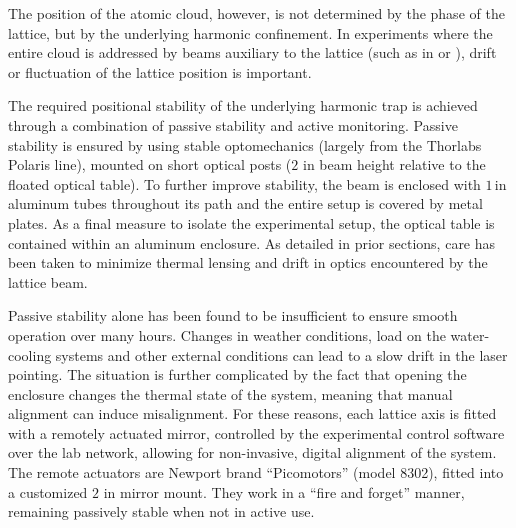 \documentclass[twocolumn,aps,pra,showpacs,preprintnumbers,bibnotes]{revtex4-1}
\begin{document}
The position of the atomic cloud, however, is not determined by the phase of the lattice, but by the underlying harmonic confinement. 
In experiments where the entire cloud is addressed by beams auxiliary to the lattice (such as in \cite{Mazurenko2016} or \cite{Choi2016}), drift or fluctuation of the lattice position is important.

The required positional stability of the underlying harmonic trap is achieved through a combination of passive stability and active monitoring. 
Passive stability is ensured by using stable optomechanics (largely from the Thorlabs Polaris line), mounted on short optical posts ($2$ in beam height relative to the floated optical table).
To further improve stability, the beam is enclosed with $1\,$in aluminum tubes throughout its path and the entire setup is covered by metal plates.
As a final measure to isolate the experimental setup, the optical table is contained within an aluminum enclosure. As detailed in prior sections, care has been taken to minimize thermal lensing and drift in optics encountered by the lattice beam.

Passive stability alone has been found to be insufficient to ensure smooth operation over many hours. Changes in weather conditions, load on the water-cooling systems and other external conditions can lead to a slow drift in the laser pointing.
The situation is further complicated by the fact that opening the enclosure changes the thermal state of the system, meaning that manual alignment can induce misalignment. 
For these reasons, each lattice axis is fitted with a remotely actuated mirror, controlled by the experimental control software over the lab network, allowing for non-invasive, digital alignment of the system. 
The remote actuators are Newport brand ``Picomotors'' (model 8302), fitted into a customized $2$ in mirror mount.
They work in a ``fire and forget'' manner, remaining passively stable when not in active use.
\end{document}
